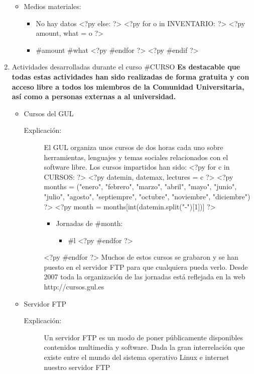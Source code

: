 \documentclass[a4paper,12pt]{report}
\begin{document}
\begin{enumerate}
\begin{itemize}
\item{Medios materiales:}
\begin{itemize}
<?py if len(INVENTARIO) == 0: ?>
\item No hay datos
<?py else: ?>
<?py     for o in INVENTARIO: ?>
<?py         amount, what = o ?>
\item{} #{amount} #{what}
<?py     #endfor ?>
<?py #endif ?>
\end{itemize}
\end{itemize}
\newpage
\item \textsf{\Large Actividades desarrolladas durante el curso #{CURSO}}
\newline
\newline
\textbf{Es destacable que todas estas actividades han sido realizadas de forma
gratuita y con acceso libre a todos los miembros de la Comunidad Universitaria, así como a personas externas a al universidad.}
\begin{itemize}
\item Cursos del GUL
\begin{description}
\item[Explicación:] El GUL organiza
unos cursos de dos horas cada uno sobre herramientas, lenguajes y temas
sociales relacionados con el software libre. Los cursos impartidos han sido:
<?py for c in CURSOS: ?>
<?py     datemin, datemax, lectures = c ?>
<?py     months = ("enero", "febrero", "marzo", "abril", "mayo", "junio", "julio", "agosto", "septiempre", "octubre", "noviembre", "diciembre") ?>
<?py     month = months[int(datemin.split("-")[1])] ?>
\begin{itemize}
\item Jornadas de #{month}:
\begin{itemize}
<?py     for l in lectures: ?>
\item #{l}
<?py #endfor ?>
\end{itemize}
\end{itemize}
<?py #endfor ?>
Muchos de estos cursos se grabaron y se han puesto en el servidor FTP para que cualquiera pueda verlo.
Desde 2007 toda la organización de las jornadas está reflejada en la web http://cursos.gul.es
\end{description}
\item Servidor FTP
\begin{description}
\item[Explicación:] 
Un servidor FTP es un modo de poner públicamente disponibles contenidos multimedia y software.
Dada la gran interrelación que existe entre el
mundo del sistema operativo Linux e internet nuestro servidor FTP

\end{description}
\end{itemize}
\end{enumerate}
\end{document}
